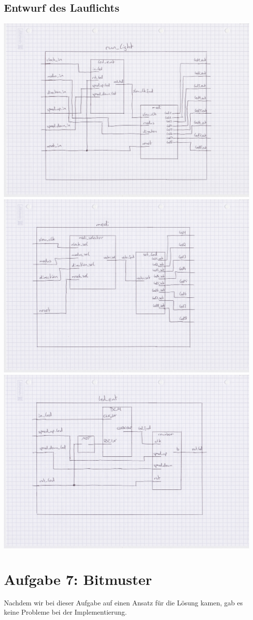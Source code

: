 \documentclass[parskip=full]{scrartcl}
\begin{document}
		\subsection{Entwurf des Lauflichts}
			\includegraphics[scale=0.1]{Bilder/runlight.jpeg} \newline
			\includegraphics[scale=0.1]{Bilder/modi.jpeg} \newpage
			\includegraphics[scale=0.1]{Bilder/ledent.jpeg}
	\section*{Aufgabe 7: Bitmuster}
		Nachdem wir bei dieser Aufgabe auf einen Ansatz für die Lösung kamen, gab es keine Probleme bei der Implementierung.
	
	
\end{document}
